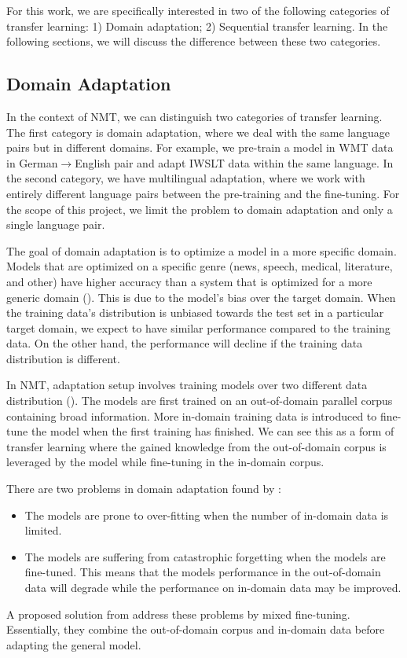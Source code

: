 For this work, we are specifically interested in two of the following categories of transfer learning: 1) Domain adaptation; 2) Sequential transfer learning. In the following sections, we will discuss the difference between these two categories.

\subsection{Domain Adaptation}
\label{sec:domain_adapt}
In the context of NMT, we can distinguish two categories of transfer learning. The first category is domain adaptation, where we deal with the same language pairs but in different domains. For example, we pre-train a model in WMT data in German$\rightarrow$English pair and adapt IWSLT data within the same language. In the second category, we have multilingual adaptation, where we work with entirely different language pairs between the pre-training and the fine-tuning. For the scope of this project, we limit the problem to domain adaptation and only a single language pair.

The goal of domain adaptation is to optimize a model in a more specific domain. Models that are optimized on a specific genre (news, speech, medical, literature, and other) have higher accuracy than a system that is optimized for a more generic domain (\cite{gao2002improving,hildebrand2005adaptation}). This is due to the model's bias over the target domain. When the training data's distribution is unbiased towards the test set in a particular target domain, we expect to have similar performance compared to the training data. On the other hand, the performance will decline if the training data distribution is different.

In NMT, adaptation setup involves training models over two different data distribution (\cite{luong2015stanford,Servan2016DomainSA,Chu2018ASO}). The models are first trained on an out-of-domain parallel corpus containing broad information. More in-domain training data is introduced to fine-tune the model when the first training has finished. We can see this as a form of transfer learning where the gained knowledge from the out-of-domain corpus is leveraged by the model while fine-tuning in the in-domain corpus.

There are two problems in domain adaptation found by \cite{Freitag2016FastDA}:
\begin{itemize}
    \item The models are prone to over-fitting when the number of in-domain data is limited.
    \item The models are suffering from catastrophic forgetting when the models are fine-tuned. This means that the models performance in the out-of-domain data will degrade while the performance on in-domain data may be improved.
\end{itemize}
A proposed solution from \cite{Chu2017AnEC} address these problems by mixed fine-tuning. Essentially, they combine the out-of-domain corpus and in-domain data before adapting the general model.

